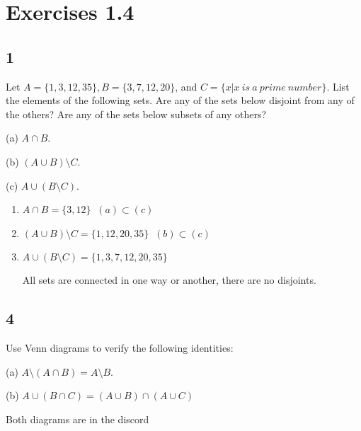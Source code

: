 \documentclass{article}
\begin{document}
\section{Exercises 1.4}
\subsection{1}
Let $A = \{1, 3, 12, 35\}, B = \{3, 7, 12, 20\}$, and $C = \{x \vert x \ is \ a \ prime \ number\}$. List the elements of the following sets. Are any of the sets below disjoint from any of the others? Are any of the sets below
subsets of any others?

(a) $A \cap B$.

(b) $(A \cup B) \setminus C$.

(c) $A \cup (B \setminus C)$.

\begin{enumerate}[label=(\alph*)]
    \item 
    $A \cap B = \{ 3, 12 \}$ $\ (a)  \subset (c) $
    \item
    $(A \cup B) \setminus C = \{ 1,12,20,35\}$ $\ (b)  \subset (c) $
    \item
     $A \cup (B \setminus C) = \{ 1,3,7,12,20,35\}$
     
     All sets are connected in one way or another, there are no disjoints.
\end{enumerate}
\subsection{4}
Use Venn diagrams to verify the following identities:

(a) $A\setminus (A \cap B) = A \setminus B$.

(b) $A \cup (B \cap C) = (A \cup B) \cap (A \cup C)$

Both diagrams are in the discord
\end{document}
